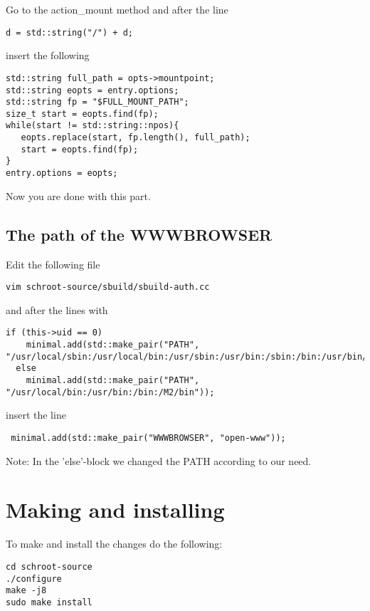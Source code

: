\documentclass[a4paper]{book}
\begin{document}
Go to the action\_mount method and after the line

\begin{verbatim}
d = std::string("/") + d;
\end{verbatim}

insert the following

\begin{verbatim}
std::string full_path = opts->mountpoint;
std::string eopts = entry.options;
std::string fp = "$FULL_MOUNT_PATH";
size_t start = eopts.find(fp);
while(start != std::string::npos){
   eopts.replace(start, fp.length(), full_path);
   start = eopts.find(fp);
}
entry.options = eopts;
\end{verbatim}


Now you are done with this part.
\subsection{The path of the WWWBROWSER}
Edit the following file

\begin{verbatim}
vim schroot-source/sbuild/sbuild-auth.cc
\end{verbatim}
and after the lines with

\begin{verbatim}
if (this->uid == 0)
    minimal.add(std::make_pair("PATH", "/usr/local/sbin:/usr/local/bin:/usr/sbin:/usr/bin:/sbin:/bin:/usr/bin/X11"));
  else
    minimal.add(std::make_pair("PATH", "/usr/local/bin:/usr/bin:/bin:/M2/bin"));
\end{verbatim}
insert the line

\begin{verbatim}
 minimal.add(std::make_pair("WWWBROWSER", "open-www"));
\end{verbatim}

Note: In the 'else'-block we changed the PATH according to our need.

\section{Making and installing}
To make and install the changes do the following:
\begin{verbatim}
cd schroot-source
./configure
make -j8
sudo make install
\end{verbatim}

\end{document}
